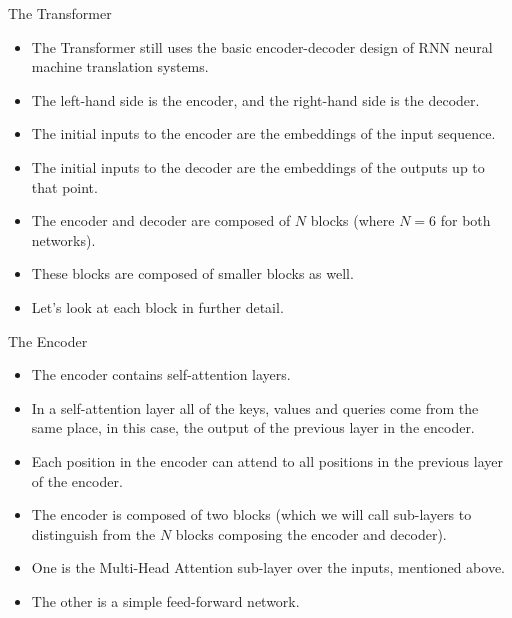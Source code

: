 \documentclass[handout]{beamer}
\begin{document}
\begin{frame}{The Transformer}
\begin{scriptsize}
\begin{itemize}

 \item  The Transformer still uses the basic encoder-decoder design of RNN neural machine translation systems.
 
 \item The left-hand side is the encoder, and the right-hand side is the decoder. 
 
 \item The initial inputs to the encoder are the embeddings of the input sequence.
 \item The initial inputs to the decoder are the embeddings of the outputs up to that point. 
 
 \item The encoder and decoder are composed of $N$ blocks (where $N = 6$ for both networks).
 
 \item These blocks are composed of smaller blocks as well. 
 
 \item Let's look at each block in further detail.
 
\end{itemize}

\end{scriptsize}

\end{frame}



\begin{frame}{The Encoder}
\begin{scriptsize}
\begin{itemize}

\item The encoder contains self-attention layers. 

\item In a self-attention layer all of the keys, values and queries come from the same place, in this case, the output of the previous layer in the encoder. 

\item Each position in the encoder can attend to all positions in the previous layer of the encoder.

 \item  The encoder is composed of two blocks (which we will call sub-layers to distinguish from the $N$ blocks composing the encoder and decoder).
\item  One is the Multi-Head Attention sub-layer over the inputs, mentioned above. 
\item The other is a simple feed-forward network. 

\end{itemize}

\end{scriptsize}


    


\end{frame}
\end{document}
